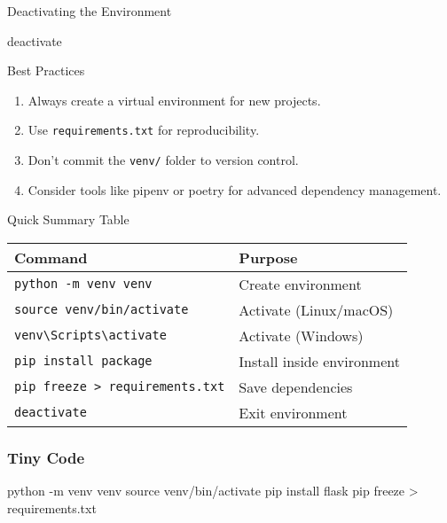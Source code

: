 \documentclass[
  letterpaper,
  DIV=11,
  numbers=noendperiod]{scrreprt}
\newenvironment{Shaded}{\begin{snugshade}}{\end{snugshade}}
\newcommand{\AttributeTok}[1]{\textcolor[rgb]{0.40,0.45,0.13}{#1}}
\newcommand{\BuiltInTok}[1]{\textcolor[rgb]{0.00,0.23,0.31}{#1}}
\newcommand{\ExtensionTok}[1]{\textcolor[rgb]{0.00,0.23,0.31}{#1}}
\newcommand{\NormalTok}[1]{\textcolor[rgb]{0.00,0.23,0.31}{#1}}
\newcommand{\OperatorTok}[1]{\textcolor[rgb]{0.37,0.37,0.37}{#1}}
\providecommand{\tightlist}{%
  \setlength{\itemsep}{0pt}\setlength{\parskip}{0pt}}
\begin{document}
Deactivating the Environment

\begin{Shaded}
\begin{Highlighting}[]
\ExtensionTok{deactivate}
\end{Highlighting}
\end{Shaded}

Best Practices

\begin{enumerate}
\def\labelenumi{\arabic{enumi}.}
\tightlist
\item
  Always create a virtual environment for new projects.
\item
  Use \texttt{requirements.txt} for reproducibility.
\item
  Don't commit the \texttt{venv/} folder to version control.
\item
  Consider tools like pipenv or poetry for advanced dependency
  management.
\end{enumerate}

Quick Summary Table

\begin{longtable}[]{@{}ll@{}}
\toprule\noalign{}
Command & Purpose \\
\midrule\noalign{}
\endhead
\bottomrule\noalign{}
\endlastfoot
\texttt{python\ -m\ venv\ venv} & Create environment \\
\texttt{source\ venv/bin/activate} & Activate (Linux/macOS) \\
\texttt{venv\textbackslash{}Scripts\textbackslash{}activate} & Activate
(Windows) \\
\texttt{pip\ install\ package} & Install inside environment \\
\texttt{pip\ freeze\ \textgreater{}\ requirements.txt} & Save
dependencies \\
\texttt{deactivate} & Exit environment \\
\end{longtable}

\subsubsection{Tiny Code}\label{tiny-code-94}

\begin{Shaded}
\begin{Highlighting}[]
\ExtensionTok{python} \AttributeTok{{-}m}\NormalTok{ venv venv}
\BuiltInTok{source}\NormalTok{ venv/bin/activate}
\ExtensionTok{pip}\NormalTok{ install flask}
\ExtensionTok{pip}\NormalTok{ freeze }\OperatorTok{\textgreater{}}\NormalTok{ requirements.txt}
\end{Highlighting}
\end{Shaded}
\end{document}
